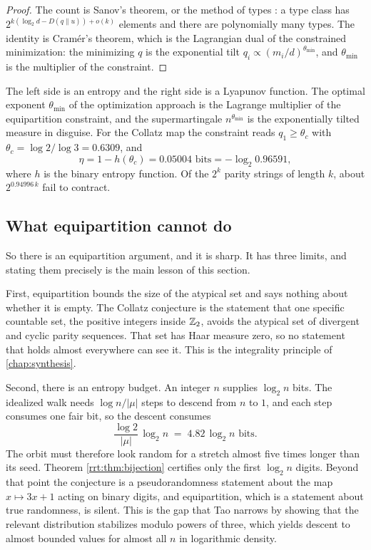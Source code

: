 \begin{proof}
The count is Sanov's theorem, or the method of types \cite{cover2006}: a type class has $2^{k(\log_2 d-D(q\|u))+o(k)}$ elements and there are polynomially many types. The identity is Cram\'er's theorem, which is the Lagrangian dual of the constrained minimization: the minimizing $q$ is the exponential tilt $q_i\propto (m_i/d)^{\theta_{\min}}$, and $\theta_{\min}$ is the multiplier of the constraint.
\end{proof}

The left side is an entropy and the right side is a Lyapunov function. The optimal exponent $\theta_{\min}$ of the optimization approach is the Lagrange multiplier of the equipartition constraint, and the supermartingale $n^{\theta_{\min}}$ is the exponentially tilted measure in disguise. For the Collatz map the constraint reads $q_1\ge\theta_c$ with $\theta_c=\log 2/\log 3=0.6309$, and
\[
\eta = 1-h(\theta_c)= 0.05004 \text{ bits} = -\log_2 0.96591 ,
\]
where $h$ is the binary entropy function. Of the $2^k$ parity strings of length $k$, about $2^{0.94996\,k}$ fail to contract.

\subsection{What equipartition cannot do}
So there is an equipartition argument, and it is sharp. It has three limits, and stating them precisely is the main lesson of this section.

First, equipartition bounds the size of the atypical set and says nothing about whether it is empty. The Collatz conjecture is the statement that one specific countable set, the positive integers inside $\mathbb{Z}_2$, avoids the atypical set of divergent and cyclic parity sequences. That set has Haar measure zero, so no statement that holds almost everywhere can see it. This is the integrality principle of \cref{chap:synthesis}.

Second, there is an entropy budget. An integer $n$ supplies $\log_2 n$ bits. The idealized walk needs $\log n/|\mu|$ steps to descend from $n$ to $1$, and each step consumes one fair bit, so the descent consumes
\[
\frac{\log 2}{|\mu|}\,\log_2 n \;=\; 4.82\,\log_2 n \text{ bits.}
\]
The orbit must therefore look random for a stretch almost five times longer than its seed. Theorem \ref{rrt:thm:bijection} certifies only the first $\log_2 n$ digits. Beyond that point the conjecture is a pseudorandomness statement about the map $x\mapsto 3x+1$ acting on binary digits, and equipartition, which is a statement about true randomness, is silent. This is the gap that Tao \cite{tao2022} narrows by showing that the relevant distribution stabilizes modulo powers of three, which yields descent to almost bounded values for almost all $n$ in logarithmic density.


